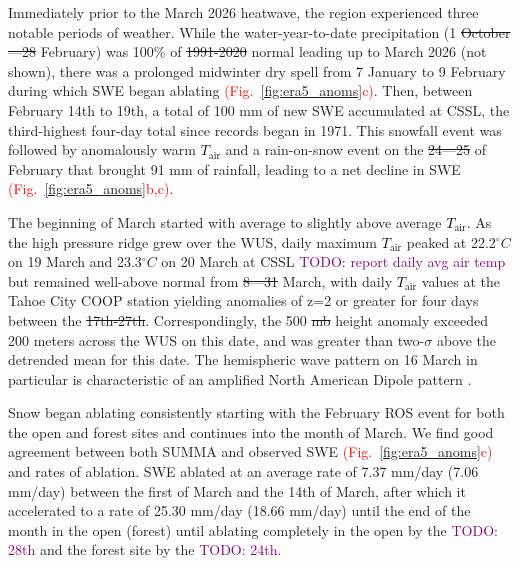 \documentclass[draft]{agujournal2019}
\newcommand{\fig}[2]{\textcolor{red}{(Fig.~\ref{#1}{#2})}}   %
\newcommand{\todo}[1]{\textcolor{purple}{TODO: #1}}      %
\newcommand{\tair}{\textcolor{black}{$T_{\mathrm{air}}$}\xspace}
\providecommand{\DIFadd}[1]{{\protect\color{blue}\uwave{#1}}} %
\providecommand{\DIFdel}[1]{{\protect\color{red}\sout{#1}}}                      %
\providecommand{\DIFaddbegin}{} %
\providecommand{\DIFaddend}{} %
\providecommand{\DIFdelbegin}{} %
\providecommand{\DIFdelend}{} %
\begin{document}
Immediately prior to the March 2026 heatwave, the region experienced three notable periods of weather.
While the water-year-to-date precipitation (1 \DIFdelbegin \DIFdel{October---28 }\DIFdelend \DIFaddbegin \DIFadd{October--28 }\DIFaddend February) was 100\% of \DIFdelbegin \DIFdel{1991-2020 }\DIFdelend \DIFaddbegin \DIFadd{1991--2020 }\DIFaddend normal leading up to March 2026 (not shown), there was a prolonged midwinter dry spell \cite{Hatchett2023} from 7 January to 9 February during which SWE began ablating \fig{fig:era5_anoms}{c}.
Then, between February 14th to 19th, a total of 100 mm of new SWE accumulated at CSSL, the third-highest four-day total since records began in 1971.
This snowfall event was followed by anomalously warm \tair and a rain-on-snow \DIFaddbegin \DIFadd{(ROS) }\DIFaddend event on the \DIFdelbegin \DIFdel{24---25 }\DIFdelend \DIFaddbegin \DIFadd{24--25 }\DIFaddend of February that brought 91 mm of rainfall, leading to a net decline in SWE \fig{fig:era5_anoms}{b,c}.

The beginning of March started with average to slightly above average \tair.
As the high pressure ridge grew over the WUS, daily maximum \tair peaked at 22.2$^{\circ}C$ on 19 March and 23.3$^{\circ}C$ on 20 March at CSSL \todo{report daily avg air temp} but remained well-above normal from \DIFdelbegin \DIFdel{8---31 }\DIFdelend \DIFaddbegin \DIFadd{8--31 }\DIFaddend March, with daily \tair values at the Tahoe City COOP station yielding anomalies of z=2 or greater for four days between the \DIFdelbegin \DIFdel{17th-27th}\DIFdelend \DIFaddbegin \DIFadd{17th--27th}\DIFaddend .
Correspondingly, the 500 \DIFdelbegin \DIFdel{mb }\DIFdelend \DIFaddbegin \DIFadd{hPa }\DIFaddend height anomaly exceeded 200 meters across the WUS on this date, and was greater than two-$\sigma$ above the detrended mean for this date.
The hemispheric wave pattern on 16 March in particular is characteristic of an amplified North American Dipole pattern \cite{Wang2014,Wang2015,Singh2016-ev}.

Snow began ablating consistently starting with the February ROS event for both the open and forest sites and continues into the month of March.
We find good agreement between both SUMMA and observed SWE \fig{fig:era5_anoms}{c} and rates of ablation.
SWE ablated at an average rate of 7.37 mm/day (7.06 mm/day) between the first of March and the 14th of March, after which it accelerated to a rate of 25.30 mm/day (18.66 mm/day) until the end of the month in the open (forest) until ablating completely in the open by the \todo{28th} and the forest site by the \todo{24th}.
\end{document}
